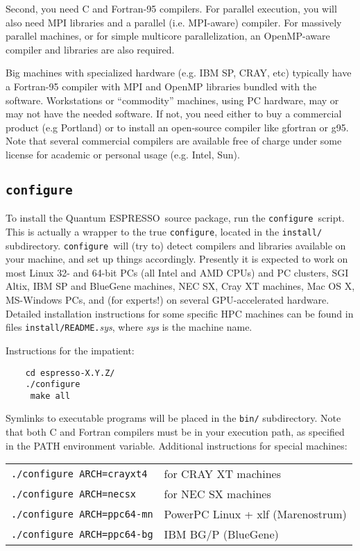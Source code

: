 \documentclass[12pt,a4paper]{article}
\def\qe{{\sc Quantum ESPRESSO}}
\def\configure{\texttt{configure}}
\begin{document}
Second, you need C and Fortran-95 compilers. For parallel 
execution, you will also need MPI libraries and a parallel
(i.e. MPI-aware) compiler. For massively parallel machines, or 
for simple multicore parallelization, an OpenMP-aware compiler
and libraries are also required.

Big machines with
specialized hardware (e.g. IBM SP, CRAY, etc) typically have a
Fortran-95 compiler with MPI and OpenMP libraries bundled with 
the software. Workstations or ``commodity'' machines, using PC 
hardware, may or may not have the needed software. If not, you need 
either to buy a commercial product (e.g Portland) or to install
an open-source compiler like gfortran or g95. 
Note that several commercial compilers are available free of charge
under some license for academic or personal usage (e.g. Intel, Sun). 

\subsection{\configure}

To install the \qe\ source package, run the \configure{}ript. This is actually a wrapper to the true \configure,
located in the \texttt{install/} subdirectory. \configure\
will (try to) detect compilers and libraries available on
your machine, and set up things accordingly. Presently it is expected
to work on most Linux 32- and 64-bit PCs (all Intel and AMD CPUs) and 
PC clusters, SGI Altix, IBM SP and BlueGene machines, NEC SX, Cray XT
machines, Mac OS X, MS-Windows PCs, and (for experts!) on several 
GPU-accelerated hardware. Detailed installation instructions for some
specific HPC machines can be found in files \texttt{install/README.}{\em sys},
where {\em sys} is the machine name.

Instructions for the impatient:
\begin{verbatim}
    cd espresso-X.Y.Z/
    ./configure
     make all
\end{verbatim}
Symlinks to executable programs will be placed in the
\texttt{bin/}
subdirectory. Note that both C and Fortran compilers must be in your execution
path, as specified in the PATH environment variable.
Additional instructions for special machines:

\begin{tabular}{ll}
    \texttt{./configure ARCH=crayxt4}& for CRAY XT machines \\
    \texttt{./configure ARCH=necsx}   & for NEC SX machines \\
    \texttt{./configure ARCH=ppc64-mn}& PowerPC Linux + xlf (Marenostrum) \\
    \texttt{./configure ARCH=ppc64-bg}& IBM BG/P (BlueGene)
\end{tabular}
\end{document}
